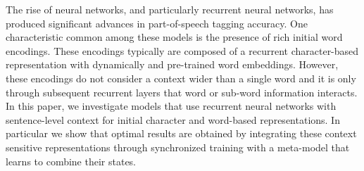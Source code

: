 The rise of neural networks, and particularly recurrent neural networks, has produced significant advances in part-of-speech tagging accuracy. One characteristic common among these models is the presence of rich initial word encodings. These encodings typically are composed of a recurrent character-based representation with dynamically and pre-trained word embeddings. However, these encodings do not consider a context wider than a single word and it is only through subsequent recurrent layers that word or sub-word information interacts. In this paper, we investigate models that use recurrent neural networks with sentence-level context for initial character and word-based representations. In particular we show that optimal results are obtained by integrating these context sensitive representations through synchronized training with a meta-model that learns to combine their states.
